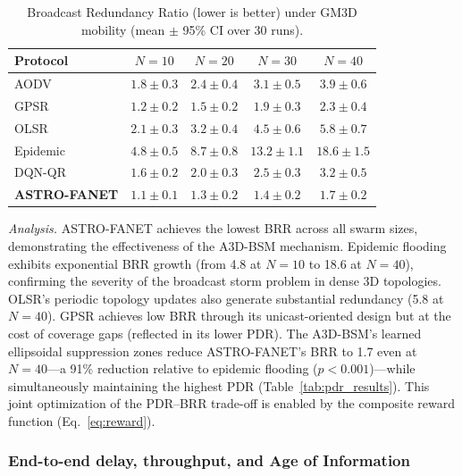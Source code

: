 \documentclass[5p,times]{elsarticle}
\begin{document}
\begin{table}[t]
\centering
\caption{Broadcast Redundancy Ratio (lower is better) under GM3D mobility (mean $\pm$ 95\% CI over 30 runs).}
\label{tab:broadcast_results}
\scriptsize
\begin{tabular}{lcccc}
\toprule
Protocol & $N=10$ & $N=20$ & $N=30$ & $N=40$ \\
\midrule
AODV & $1.8 \pm 0.3$ & $2.4 \pm 0.4$ & $3.1 \pm 0.5$ & $3.9 \pm 0.6$ \\
GPSR & $1.2 \pm 0.2$ & $1.5 \pm 0.2$ & $1.9 \pm 0.3$ & $2.3 \pm 0.4$ \\
OLSR & $2.1 \pm 0.3$ & $3.2 \pm 0.4$ & $4.5 \pm 0.6$ & $5.8 \pm 0.7$ \\
Epidemic & $4.8 \pm 0.5$ & $8.7 \pm 0.8$ & $13.2 \pm 1.1$ & $18.6 \pm 1.5$ \\
DQN-QR & $1.6 \pm 0.2$ & $2.0 \pm 0.3$ & $2.5 \pm 0.3$ & $3.2 \pm 0.5$ \\
\textbf{ASTRO-FANET} & $\mathbf{1.1 \pm 0.1}$ & $\mathbf{1.3 \pm 0.2}$ & $\mathbf{1.4 \pm 0.2}$ & $\mathbf{1.7 \pm 0.2}$ \\
\bottomrule
\end{tabular}
\end{table}

\textit{Analysis.} ASTRO-FANET achieves the lowest BRR across all swarm sizes, demonstrating the effectiveness of the A3D-BSM mechanism. Epidemic flooding exhibits exponential BRR growth (from 4.8 at $N=10$ to 18.6 at $N=40$), confirming the severity of the broadcast storm problem in dense 3D topologies. OLSR's periodic topology updates also generate substantial redundancy (5.8 at $N=40$). GPSR achieves low BRR through its unicast-oriented design but at the cost of coverage gaps (reflected in its lower PDR). The A3D-BSM's learned ellipsoidal suppression zones reduce ASTRO-FANET's BRR to 1.7 even at $N=40$---a 91\% reduction relative to epidemic flooding ($p < 0.001$)---while simultaneously maintaining the highest PDR (Table~\ref{tab:pdr_results}). This joint optimization of the PDR--BRR trade-off is enabled by the composite reward function (Eq.~\eqref{eq:reward}).

\subsubsection{End-to-end delay, throughput, and Age of Information}
\end{document}
